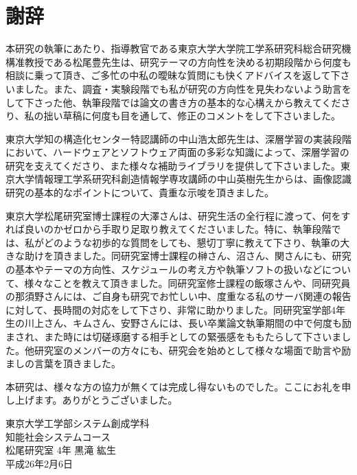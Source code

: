 \chapter*{謝辞}
本研究の執筆にあたり、指導教官である東京大学大学院工学系研究科総合研究機構准教授である松尾豊先生は、研究テーマの方向性を決める初期段階から何度も相談に乗って頂き、ご多忙の中私の曖昧な質問にも快くアドバイスを返して下さいました。また、調査・実験段階でも私が研究の方向性を見失わないよう助言をして下さった他、執筆段階では論文の書き方の基本的な心構えから教えてくださり、私の拙い草稿に何度も目を通して、修正のコメントをして下さいました。\par
東京大学知の構造化センター特認講師の中山浩太郎先生は、深層学習の実装段階において、ハードウェアとソフトウェア両面の多彩な知識によって、深層学習の研究を支えてくださり、また様々な補助ライブラリを提供して下さいました。東京大学情報理工学系研究科創造情報学専攻講師の中山英樹先生からは、画像認識研究の基本的なポイントについて、貴重な示唆を頂きました。\par
東京大学松尾研究室博士課程の大澤さんは、研究生活の全行程に渡って、何をすれば良いのかゼロから手取り足取り教えてくださいました。特に、執筆段階では、私がどのような初歩的な質問をしても、懇切丁寧に教えて下さり、執筆の大きな助けを頂きました。同研究室博士課程の榊さん、沼さん、関さんにも、研究の基本やテーマの方向性、スケジュールの考え方や執筆ソフトの扱いなどについて、様々なことを教えて頂きました。同研究室修士課程の飯塚さんや、同研究員の那須野さんには、ご自身も研究でお忙しい中、度重なる私のサーバ関連の報告に対して、長時間の対応をして下さり、非常に助かりました。同研究室学部4年生の川上さん、キムさん、安野さんには、長い卒業論文執筆期間の中で何度も励まされ、また時には切磋琢磨する相手としての緊張感をももたらして下さいました。他研究室のメンバーの方々にも、研究会を始めとして様々な場面で助言や励ましの言葉を頂きました。\par
本研究は、様々な方の協力が無くては完成し得ないものでした。ここにお礼を申し上げます。ありがとうございました。

\begin{flushright}
東京大学工学部システム創成学科 \\
知能社会システムコース\\
松尾研究室 4年 黒滝 紘生\\
平成26年2月6日\\
\end{flushright}